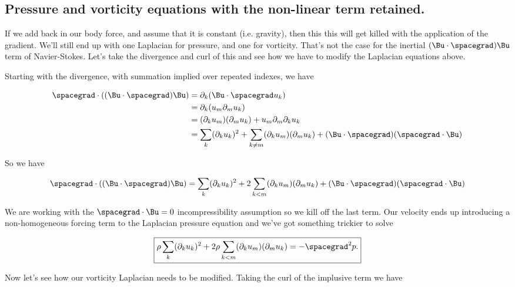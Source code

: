 \subsection{Pressure and vorticity equations with the non-linear term retained.}

If we add back in our body force, and assume that it is constant (i.e. gravity), then this this will get killed with the application of the gradient.  We'll still end up with one Laplacian for pressure, and one for vorticity.  That's not the case for the inertial $(\Bu \cdot \spacegrad) \Bu$ term of Navier-Stokes.  Let's take the divergence and curl of this and see how we have to modify the Laplacian equations above.

Starting with the divergence, with summation implied over repeated indexes, we have

\begin{align*}
\spacegrad \cdot ((\Bu \cdot \spacegrad) \Bu)
&=
\partial_k ( \Bu \cdot \spacegrad u_k ) \\
&=
\partial_k ( u_m \partial_m u_k ) \\
&=
(\partial_k u_m) (\partial_m u_k ) 
+ u_m \partial_m \partial_k u_k \\
&=
\sum_k (\partial_k u_k)^2
+
\sum_{k \ne m} (\partial_k u_m) (\partial_m u_k ) 
+ (\Bu \cdot \spacegrad) ( \spacegrad \cdot \Bu )
\end{align*}

So we have

\begin{equation}\label{eqn:inclinedFlowWithoutConstantHeightAssumption:480}
\spacegrad \cdot ((\Bu \cdot \spacegrad) \Bu)
=
\sum_k (\partial_k u_k)^2
+
2 \sum_{k < m} (\partial_k u_m) (\partial_m u_k ) 
+ (\Bu \cdot \spacegrad) ( \spacegrad \cdot \Bu )
\end{equation}

We are working with the $\spacegrad \cdot \Bu = 0$ incompressibility assumption so we kill off the last term.  Our velocity ends up introducing a non-homogeneous forcing term to the Laplacian pressure equation and we've got something trickier to solve

\begin{equation}\label{eqn:inclinedFlowWithoutConstantHeightAssumption:500}
\boxed{
\rho \sum_k (\partial_k u_k)^2
+
2 \rho \sum_{k < m} (\partial_k u_m) (\partial_m u_k ) 
=
-\spacegrad^2 p.
}
\end{equation}

Now let's see how our vorticity Laplacian needs to be modified.  Taking the curl of the implusive term we have

